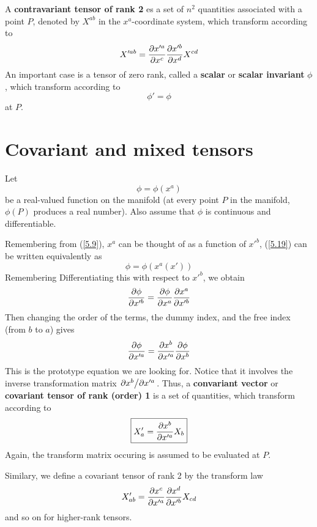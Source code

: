 A \textbf{contravariant tensor of rank 2} es a set of $n^2$ quantities associated with a point $P$, denoted by $X^{ab}$ in the $x^{a}$-coordinate system, which transform according to 
\begin{equation}\label{5.17}
  X'^{ab}=\pdv{x'^{a}}{x^c}\pdv{x'^b}{x^d}X^{cd }
\end{equation}
An important case is a tensor of zero rank, called a \textbf{scalar} or \textbf{scalar invariant} $\phi$, which transform according to 
\begin{equation}\label{5.18}
  \boxed{\phi' =\phi}
\end{equation}
at $P$.

\section{Covariant and mixed tensors}
Let
\begin{equation}\label{5.19}
  \phi=\phi(x^{a})
\end{equation}
be a real-valued function on the manifold (at every point $P$ in the manifold, $\phi(P)$ produces a real number). Also assume that $\phi$ is continuous and differentiable.

Remembering from (\ref{5.9}), $x^{a}$ can be thought of as a function of $x'^b$, (\ref{5.19}) can be written equivalently as $$\phi=\phi(x^{a}(x'))$$ Remembering Differentiating this with respect to $x'^b$, we obtain 
\begin{equation*}
  \pdv{\phi}{x'^b}=\pdv{\phi}{x^{a}}\pdv{x^{a}}{x'^b }
\end{equation*}
Then changing the order of the terms, the dummy index, and the free index (from $b$ to $a$) gives
\begin{equation}\label{5.20}
  \pdv{\phi}{x'^{a}}=\pdv{x^b}{x'^{a}}\pdv{\phi}{x^b }
\end{equation}
This is the prototype equation we are looking for. Notice that it involves the inverse transformation matrix $\pdv*{x^b}{x'^{a}}$. Thus, a \textbf{convariant vector} or \textbf{covariant tensor of rank (order) 1} is a set of quantities, which transform according to 
\begin{equation}\label{5.21}
  \boxed{X'_a=\pdv{x^b}{x'^{a}}X_b}
\end{equation}
Again, the transform matrix occuring is assumed to be evaluated at $P$.

Similary, we define a covariant tensor of rank 2 by the transform law
\begin{equation}\label{5.22}
  X'_{ab} = \pdv{x^c}{x'^a}\pdv{x^d}{x'^b}X_{cd}
\end{equation}
and so on for higher-rank tensors.


